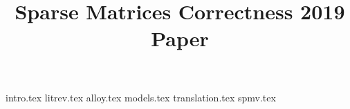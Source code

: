\documentclass[sigconf]{acmart}
\begin{document}
\title{Sparse Matrices Correctness 2019 Paper}
\maketitle

{intro.tex}
{litrev.tex}
{alloy.tex}
{models.tex}
{translation.tex}
{spmv.tex}



\end{document}
